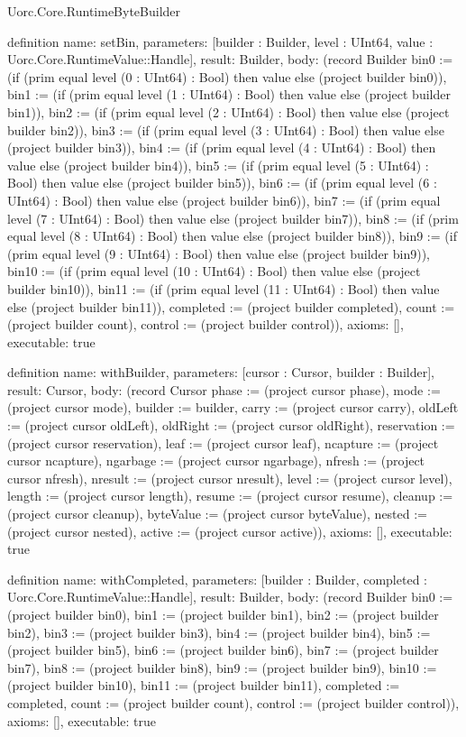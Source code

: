 \begin{lexlean}{Uorc.Core.RuntimeByteBuilder}
\begin{semanticmodule}
definition{
  name: setBin,
  parameters: [builder : Builder, level : UInt64, value : Uorc.Core.RuntimeValue::Handle],
  result: Builder,
  body: (record Builder {bin0 := (if (prim equal level (0 : UInt64) : Bool) then value else (project builder bin0)), bin1 := (if (prim equal level (1 : UInt64) : Bool) then value else (project builder bin1)), bin2 := (if (prim equal level (2 : UInt64) : Bool) then value else (project builder bin2)), bin3 := (if (prim equal level (3 : UInt64) : Bool) then value else (project builder bin3)), bin4 := (if (prim equal level (4 : UInt64) : Bool) then value else (project builder bin4)), bin5 := (if (prim equal level (5 : UInt64) : Bool) then value else (project builder bin5)), bin6 := (if (prim equal level (6 : UInt64) : Bool) then value else (project builder bin6)), bin7 := (if (prim equal level (7 : UInt64) : Bool) then value else (project builder bin7)), bin8 := (if (prim equal level (8 : UInt64) : Bool) then value else (project builder bin8)), bin9 := (if (prim equal level (9 : UInt64) : Bool) then value else (project builder bin9)), bin10 := (if (prim equal level (10 : UInt64) : Bool) then value else (project builder bin10)), bin11 := (if (prim equal level (11 : UInt64) : Bool) then value else (project builder bin11)), completed := (project builder completed), count := (project builder count), control := (project builder control)}),
  axioms: [],
  executable: true
}

definition{
  name: withBuilder,
  parameters: [cursor : Cursor, builder : Builder],
  result: Cursor,
  body: (record Cursor {phase := (project cursor phase), mode := (project cursor mode), builder := builder, carry := (project cursor carry), oldLeft := (project cursor oldLeft), oldRight := (project cursor oldRight), reservation := (project cursor reservation), leaf := (project cursor leaf), ncapture := (project cursor ncapture), ngarbage := (project cursor ngarbage), nfresh := (project cursor nfresh), nresult := (project cursor nresult), level := (project cursor level), length := (project cursor length), resume := (project cursor resume), cleanup := (project cursor cleanup), byteValue := (project cursor byteValue), nested := (project cursor nested), active := (project cursor active)}),
  axioms: [],
  executable: true
}

definition{
  name: withCompleted,
  parameters: [builder : Builder, completed : Uorc.Core.RuntimeValue::Handle],
  result: Builder,
  body: (record Builder {bin0 := (project builder bin0), bin1 := (project builder bin1), bin2 := (project builder bin2), bin3 := (project builder bin3), bin4 := (project builder bin4), bin5 := (project builder bin5), bin6 := (project builder bin6), bin7 := (project builder bin7), bin8 := (project builder bin8), bin9 := (project builder bin9), bin10 := (project builder bin10), bin11 := (project builder bin11), completed := completed, count := (project builder count), control := (project builder control)}),
  axioms: [],
  executable: true
}


\end{semanticmodule}
\end{lexlean}
